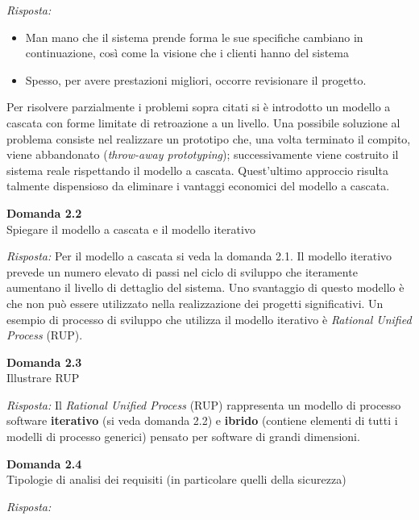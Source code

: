 \documentclass{article}
\newenvironment{problem}[2][Domanda]
    { \begin{mdframed}[backgroundcolor=gray!20] \textbf{#1 #2} \\}
    {  \end{mdframed}}
\newenvironment{solution}
    {\textit{Risposta:}}
    {}
\begin{document}
\begin{solution}
\begin{itemize}
	\item Man mano che il sistema prende forma le sue specifiche cambiano in continuazione, così come la visione che i clienti hanno del sistema
	\item Spesso, per avere prestazioni migliori, occorre revisionare il progetto.
\end{itemize}
Per risolvere parzialmente i problemi sopra citati si è introdotto un modello a cascata con forme limitate di retroazione a un livello.
Una possibile soluzione al problema consiste nel realizzare un prototipo che, una volta terminato il compito, viene abbandonato (\textit{throw-away prototyping}); successivamente viene costruito il sistema reale rispettando il modello a cascata.
\newline
Quest'ultimo approccio risulta talmente dispensioso da eliminare i vantaggi economici del modello a cascata.
\end{solution}


\begin{problem}{2.2}
Spiegare il modello a cascata e il modello iterativo
\end{problem}
\begin{solution}
Per il modello a cascata si veda la domanda 2.1.
\newline
Il modello iterativo prevede un numero elevato di passi nel ciclo di sviluppo che iteramente aumentano il livello di dettaglio del sistema.
Uno svantaggio di questo modello è che non può essere utilizzato nella realizzazione dei progetti significativi.
Un esempio di processo di sviluppo che utilizza il modello iterativo è \textit{Rational Unified Process} (RUP).
\end{solution}


\begin{problem}{2.3}
Illustrare RUP
\end{problem}
\begin{solution}
Il \textit{Rational Unified Process} (RUP) rappresenta un modello di processo software \textbf{iterativo} (si veda domanda 2.2) e \textbf{ibrido} (contiene elementi di tutti i modelli di processo generici) pensato per software di grandi dimensioni.

\end{solution}

\begin{problem}{2.4}
Tipologie di analisi dei requisiti (in particolare quelli della sicurezza)
\end{problem}
\begin{solution}
\end{solution}
\end{document}
